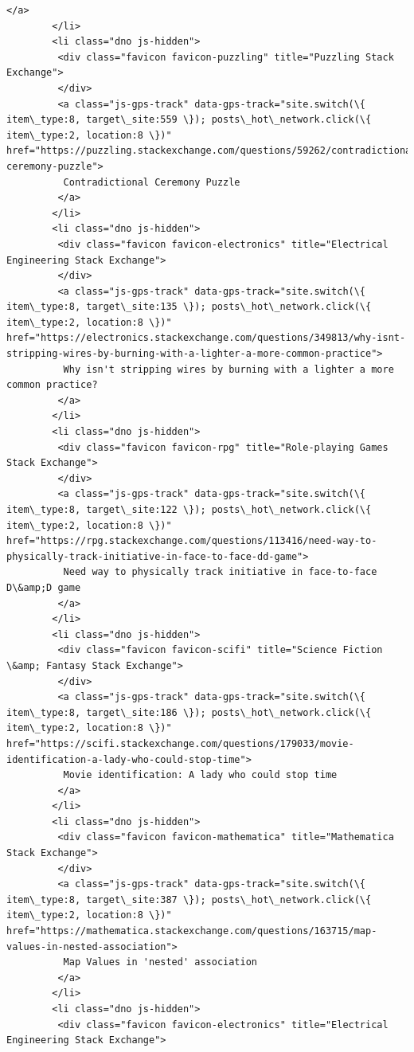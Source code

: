 \documentclass[11pt]{article}
\begin{document}
\begin{Verbatim}[commandchars=\\\{\}]
         </a>
        </li>
        <li class="dno js-hidden">
         <div class="favicon favicon-puzzling" title="Puzzling Stack Exchange">
         </div>
         <a class="js-gps-track" data-gps-track="site.switch(\{ item\_type:8, target\_site:559 \}); posts\_hot\_network.click(\{ item\_type:2, location:8 \})" href="https://puzzling.stackexchange.com/questions/59262/contradictional-ceremony-puzzle">
          Contradictional Ceremony Puzzle
         </a>
        </li>
        <li class="dno js-hidden">
         <div class="favicon favicon-electronics" title="Electrical Engineering Stack Exchange">
         </div>
         <a class="js-gps-track" data-gps-track="site.switch(\{ item\_type:8, target\_site:135 \}); posts\_hot\_network.click(\{ item\_type:2, location:8 \})" href="https://electronics.stackexchange.com/questions/349813/why-isnt-stripping-wires-by-burning-with-a-lighter-a-more-common-practice">
          Why isn't stripping wires by burning with a lighter a more common practice?
         </a>
        </li>
        <li class="dno js-hidden">
         <div class="favicon favicon-rpg" title="Role-playing Games Stack Exchange">
         </div>
         <a class="js-gps-track" data-gps-track="site.switch(\{ item\_type:8, target\_site:122 \}); posts\_hot\_network.click(\{ item\_type:2, location:8 \})" href="https://rpg.stackexchange.com/questions/113416/need-way-to-physically-track-initiative-in-face-to-face-dd-game">
          Need way to physically track initiative in face-to-face D\&amp;D game
         </a>
        </li>
        <li class="dno js-hidden">
         <div class="favicon favicon-scifi" title="Science Fiction \&amp; Fantasy Stack Exchange">
         </div>
         <a class="js-gps-track" data-gps-track="site.switch(\{ item\_type:8, target\_site:186 \}); posts\_hot\_network.click(\{ item\_type:2, location:8 \})" href="https://scifi.stackexchange.com/questions/179033/movie-identification-a-lady-who-could-stop-time">
          Movie identification: A lady who could stop time
         </a>
        </li>
        <li class="dno js-hidden">
         <div class="favicon favicon-mathematica" title="Mathematica Stack Exchange">
         </div>
         <a class="js-gps-track" data-gps-track="site.switch(\{ item\_type:8, target\_site:387 \}); posts\_hot\_network.click(\{ item\_type:2, location:8 \})" href="https://mathematica.stackexchange.com/questions/163715/map-values-in-nested-association">
          Map Values in 'nested' association
         </a>
        </li>
        <li class="dno js-hidden">
         <div class="favicon favicon-electronics" title="Electrical Engineering Stack Exchange">

\end{Verbatim}
\end{document}
